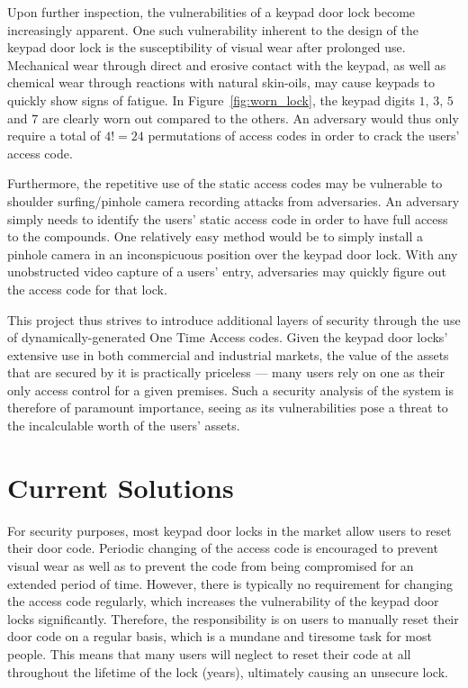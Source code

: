 \documentclass[conference]{IEEEtran}
\begin{document}
	Upon further inspection, the vulnerabilities of a keypad door lock become increasingly apparent.
One such vulnerability inherent to the design of the keypad door lock is the susceptibility of visual wear after prolonged use.
Mechanical wear through direct and erosive contact with the keypad, as well as chemical wear through reactions with natural skin-oils, may cause keypads to quickly show signs of fatigue.
In Figure~\ref{fig:worn_lock}, the keypad digits $1$, $3$, $5$ and $7$ are clearly worn out compared to the others. An adversary would thus only require a total of $4! = 24$ permutations of access codes in order to crack the users’ access code.

	Furthermore, the repetitive use of the static access codes may be vulnerable to shoulder surfing/pinhole camera recording attacks from adversaries.
An adversary simply needs to identify the users’ static access code in order to have full access to the compounds.
One relatively easy method would be to simply install a pinhole camera in an inconspicuous position over the keypad door lock.
With any unobstructed video capture of a users’ entry, adversaries may quickly figure out the access code for that lock.

	This project thus strives to introduce additional layers of security through the use of dynamically-generated One Time Access codes.
Given the keypad door locks’ extensive use in both commercial and industrial markets, the value of the assets that are secured by it is practically priceless --- many users rely on one as their only access control for a given premises.
Such a security analysis of the system is therefore of paramount importance, seeing as its vulnerabilities pose a threat to the incalculable worth of the users’ assets.

\section{Current Solutions}
	For security purposes, most keypad door locks in the market allow users to reset their door code.
Periodic changing of the access code is encouraged to prevent visual wear as well as to prevent the code from being compromised for an extended period of time.
However, there is typically no requirement for changing the access code regularly, which increases the vulnerability of the keypad door locks significantly.
Therefore, the responsibility is on users to manually reset their door code on a regular basis, which is a mundane and tiresome task for most people.
This means that many users will neglect to reset their code at all throughout the lifetime of the lock (years), ultimately causing an unsecure lock.
\end{document}

